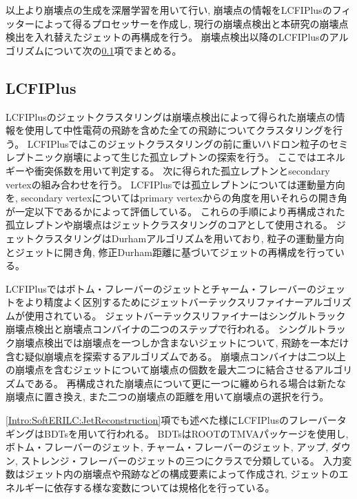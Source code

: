以上より崩壊点の生成を深層学習を用いて行い, 崩壊点の情報をLCFIPlusのフィッターによって得るプロセッサーを作成し, 現行の崩壊点検出と本研究の崩壊点検出を入れ替えたジェットの再構成を行う。
崩壊点検出以降のLCFIPlusのアルゴリズムについて次の\ref{Com:FlaTagCom:LCFIPlus}項でまとめる。


\subsection{LCFIPlus} \label{Com:FlaTagCom:LCFIPlus}

LCFIPlusのジェットクラスタリングは崩壊点検出によって得られた崩壊点の情報を使用して中性電荷の飛跡を含めた全ての飛跡についてクラスタリングを行う。
LCFIPlusではこのジェットクラスタリングの前に重いハドロン粒子のセミレプトニック崩壊によって生じた孤立レプトンの探索を行う。
ここではエネルギーや衝突係数を用いて判定する。
次に得られた孤立レプトンとsecondary vertexの組み合わせを行う。
LCFIPlusでは孤立レプトンについては運動量方向を, secondary vertexについてはprimary vertexからの角度を用いそれらの開き角が一定以下であるかによって評価している。
これらの手順により再構成された孤立レプトンや崩壊点はジェットクラスタリングのコアとして使用される。
ジェットクラスタリングはDurhamアルゴリズムを用いており, 粒子の運動量方向とジェットに開き角, 修正Durham距離に基づいてジェットの再構成を行っている。

LCFIPlusではボトム・フレーバーのジェットとチャーム・フレーバーのジェットをより精度よく区別するためにジェットバーテックスリファイナーアルゴリズムが使用されている。
ジェットバーテックスリファイナーはシングルトラック崩壊点検出と崩壊点コンバイナの二つのステップで行われる。
シングルトラック崩壊点検出では崩壊点を一つしか含まないジェットについて, 飛跡を一本だけ含む疑似崩壊点を探索するアルゴリズムである。
崩壊点コンバイナは二つ以上の崩壊点を含むジェットについて崩壊点の個数を最大二つに結合させるアルゴリズムである。
再構成された崩壊点について更に一つに纏められる場合は新たな崩壊点に置き換え, また二つの崩壊点の距離を用いて崩壊点の選択を行う。

\ref{Intro:SoftERILC:JetReconstruction}項でも述べた様にLCFIPlusのフレーバータギングはBDTsを用いて行われる。
BDTsはROOTのTMVAパッケージを使用し, ボトム・フレーバーのジェット, チャーム・フレーバーのジェット, アップ, ダウン, ストレンジ・フレーバーのジェットの三つにクラスで分類している。
入力変数はジェット内の崩壊点や飛跡などの構成要素によって作成され, ジェットのエネルギーに依存する様な変数については規格化を行っている。

